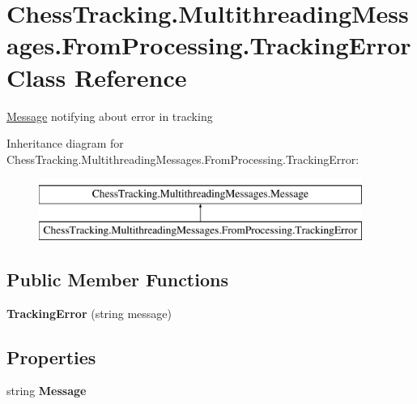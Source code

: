 \hypertarget{class_chess_tracking_1_1_multithreading_messages_1_1_from_processing_1_1_tracking_error}{}\section{Chess\+Tracking.\+Multithreading\+Messages.\+From\+Processing.\+Tracking\+Error Class Reference}
\label{class_chess_tracking_1_1_multithreading_messages_1_1_from_processing_1_1_tracking_error}


\mbox{\hyperlink{class_chess_tracking_1_1_multithreading_messages_1_1_message}{Message}} notifying about error in tracking  


Inheritance diagram for Chess\+Tracking.\+Multithreading\+Messages.\+From\+Processing.\+Tracking\+Error\+:\begin{figure}[H]
\begin{center}
\leavevmode
\includegraphics[height=2.000000cm]{class_chess_tracking_1_1_multithreading_messages_1_1_from_processing_1_1_tracking_error}
\end{center}
\end{figure}
\subsection*{Public Member Functions}
\begin{DoxyCompactItemize}
\item 
\mbox{\label{class_chess_tracking_1_1_multithreading_messages_1_1_from_processing_1_1_tracking_error_a7f1090ef601d68778d38c8a2ce869e27}} 
{\bfseries Tracking\+Error} (string message)
\end{DoxyCompactItemize}
\subsection*{Properties}
\begin{DoxyCompactItemize}
\item 
\mbox{\label{class_chess_tracking_1_1_multithreading_messages_1_1_from_processing_1_1_tracking_error_a5b02f776600260d02aef0510af4db787}} 
string {\bfseries Message}
\end{DoxyCompactItemize}


